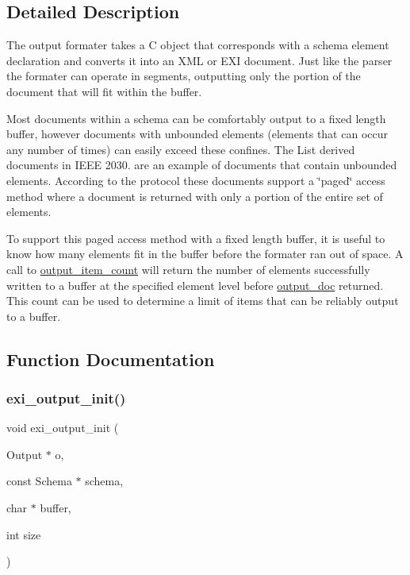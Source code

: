 \subsection{Detailed Description}
The output formater takes a C object that corresponds with a schema element declaration and converts it into an X\+ML or E\+XI document. Just like the parser the formater can operate in segments, outputting only the portion of the document that will fit within the buffer.

Most documents within a schema can be comfortably output to a fixed length buffer, however documents with unbounded elements (elements that can occur any number of times) can easily exceed these confines. The List derived documents in I\+E\+EE 2030. are an example of documents that contain unbounded elements. According to the protocol these documents support a \char`\"{}paged\char`\"{} access method where a document is returned with only a portion of the entire set of elements.

To support this paged access method with a fixed length buffer, it is useful to know how many elements fit in the buffer before the formater ran out of space. A call to \hyperlink{group__output_ga3d946f83e9903a8f747658e0661a5e45}{output\+\_\+item\+\_\+count} will return the number of elements successfully written to a buffer at the specified element level before \hyperlink{group__output_ga4061286ee8f7db4179a5c05cd0c53ab1}{output\+\_\+doc} returned. This count can be used to determine a limit of items that can be reliably output to a buffer. 

\subsection{Function Documentation}
\mbox{\label{group__output_ga6a3d8746b3070887a072f85dccf9d1c4}} 
\subsubsection{\texorpdfstring{exi\+\_\+output\+\_\+init()}{exi\_output\_init()}}
{\footnotesize\ttfamily void exi\+\_\+output\+\_\+init (\begin{DoxyParamCaption}\item[{Output $\ast$}]{o,  }\item[{const Schema $\ast$}]{schema,  }\item[{char $\ast$}]{buffer,  }\item[{int}]{size }\end{DoxyParamCaption})}



